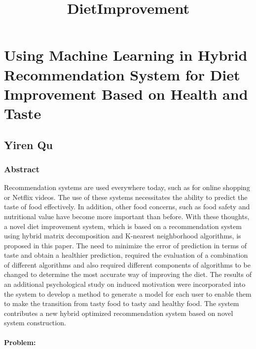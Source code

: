 \documentclass[11pt]{article}
\title{DietImprovement}
\begin{document}
    
    
    \maketitle
    
    

    
    \section{Using Machine Learning in Hybrid Recommendation System for Diet
Improvement Based on Health and
Taste}\label{using-machine-learning-in-hybrid-recommendation-system-for-diet-improvement-based-on-health-and-taste}

    \subsection{Yiren Qu}\label{yiren-qu}

    \subsubsection{Abstract}\label{abstract}

Recommendation systems are used everywhere today, such as for online
shopping or Netflix videos. The use of these systems necessitates the
ability to predict the taste of food effectively. In addition, other
food concerns, such as food safety and nutritional value have become
more important than before. With these thoughts, a novel diet
improvement system, which is based on a recommendation system using
hybrid matrix decomposition and K-nearest neighborhood algorithms, is
proposed in this paper. The need to minimize the error of prediction in
terms of taste and obtain a healthier prediction, required the
evaluation of a combination of different algorithms and also required
different components of algorithms to be changed to determine the most
accurate way of improving the diet. The results of an additional
psychological study on induced motivation were incorporated into the
system to develop a method to generate a model for each user to enable
them to make the transition from tasty food to tasty and healthy food.
The system contributes a new hybrid optimized recommendation system
based on novel system construction.

    \paragraph{Problem:}\label{problem}
\end{document}

